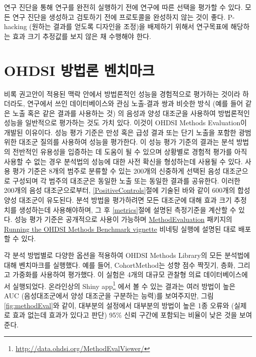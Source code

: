 \documentclass[10.5pt]{book}
\let\rmarkdownfootnote\footnote%
\def\footnote{\protect\rmarkdownfootnote}
\theoremstyle{definition}
\theoremstyle{definition}
\theoremstyle{definition}
\theoremstyle{remark}
\let\BeginKnitrBlock\begin \let\EndKnitrBlock\end
\begin{document}
\BeginKnitrBlock{rmdimportant}
연구 진단을 통해 연구를 완전히 실행하기 전에 연구에 따른 선택을 평가할
수 있다. 모든 연구 진단을 생성하고 검토하기 전에 프로토콜을 완성하지
않는 것이 좋다. P-hacking (원하는 결과를 얻도록 디자인을 조정)을
배제하기 위해서 연구목표에 해당하는 효과 크기 추정값를 보지 않은 채
수행해야 한다.
\EndKnitrBlock{rmdimportant}

\section{OHDSI 방법론 벤치마크}\label{ohdsi--}


비록 권고안이 적용된 맥락 안에서 방법론적인 성능을 경험적으로 평가하는
것이라 하더라도, 연구에서 쓰인 데이터베이스와 관심 노출-결과 쌍과 비슷한
방식 (예를 들어 같은 노출 혹은 같은 결과를 사용하는 것) 의 음성과 양성
대조군을 사용하여 방법론적인 성능을 일반적으로 평가하는 것도 가치 있다.
이것이 OHDSI Methods Evaluation이 개발된 이유이다. 성능 평가 기준은 만성
혹은 급성 결과 또는 단기 노출을 포함한 광범위한 대조군 질의를 사용하여
성능을 평가한다. 이 성능 평가 기준의 결과는 분석 방법의 전반적인
유용성을 입증하는 데 도움이 될 수 있으며 상황별로 경험적 평가를 아직
사용할 수 없는 경우 분석법의 성능에 대한 사전 확신을 형성하는데 사용될
수 있다. 사용 평가 기준은 8개의 범주로 분류할 수 있는 200개의 신중하게
선택된 음성 대조군으로 구성되며 각 범주의 대조군은 동일한 노출 또는
동일한 결과를 공유한다. 이러한 200개의 음성 대조군으로부터,
\ref{PositiveControls}절에 기술된 바와 같이 600개의 합성 양성 대조군이
유도된다. 분석 방법을 평가하려면 모든 대조군에 대해 효과 크기 추정치를
생성하는데 사용해야하며, 그 후 \ref{metrics}절에 설명된 측정기준을
계산할 수 있다. 성능 평가 기준은 공개적으로 사용이 가능하며
\href{https://ohdsi.github.io/MethodEvaluation/}{MethodEvaluation}
패키지의
\href{https://ohdsi.github.io/MethodEvaluation/articles/OhdsiMethodsBenchmark.html}{Running
the OHDSI Methods Benchmark vignette} 비네팅 실행에 설명된 대로 배포할
수 있다.

각 분석 방법별로 다양한 옵션을 적용하여 OHDSI Methods Library의 모든
분석법에 대해 벤치마크를 실행했다. 예를 들어, CohortMethod는 성향 점수
짝짓기, 층화, 그리고 가중화를 사용하여 평가했다. 이 실험은 4개의 대규모
관찰형 의료 데이터베이스에서 실행되었다. 온라인상의 Shiny app\footnote{\url{http://data.ohdsi.org/MethodEvalViewer/}}
에서 볼 수 있는 결과는 여러 방법이 높은 AUC (음성대조군에서 양성
대조군을 구분하는 능력)를 보여주지만, 그림 \ref{fig:methodEval}와 같이,
대부분의 설정에서 대부분의 방법이 높은 1종 오류와 (실제로 효과 없는데
효과가 있다고 판단) 95\% 신뢰 구간에 포함되는 비율이 낮은 것을 보여준다.
\end{document}
